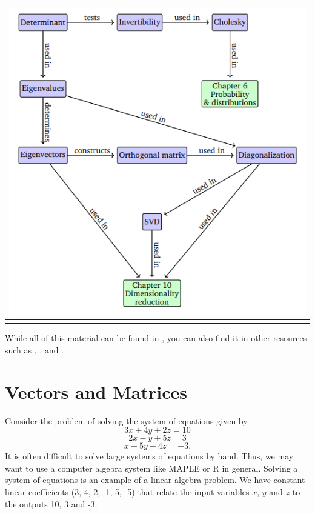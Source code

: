 \documentclass[
]{book}
\theoremstyle{definition}
\theoremstyle{definition}
\theoremstyle{definition}
\theoremstyle{definition}
\theoremstyle{remark}
\begin{document}
\begin{longtable}[]{@{}c@{}}
\toprule\noalign{}
\includegraphics{MML5.png} \\
\midrule\noalign{}
\endhead
\bottomrule\noalign{}
\endlastfoot
\end{longtable}

While all of this material can be found in \citep{Deisenroth_Faisal_Ong_2020}, you can also find it in other resources such as \citep{Banerjee_Roy_2014}, \citep{Boas_2006}, \citep{enwiki:1124890855} and \citep{Strang_2009}.

\hypertarget{vectors-and-matrices}{%
\section{Vectors and Matrices}\label{vectors-and-matrices}}

Consider the problem of solving the system of equations given by \[3x + 4y + 2z= 10\] \[2x - y + 5z= 3\] \[x-5y + 4z = -3.\] It is often difficult to solve large systems of equations by hand. Thus, we may want to use a computer algebra system like MAPLE or R in general. Solving a system of equations is an example of a linear algebra problem. We have constant linear coefficients (3, 4, 2, -1, 5, -5) that relate the input variables \(x\), \(y\) and \(z\) to the outputs 10, 3 and -3.
\end{document}
